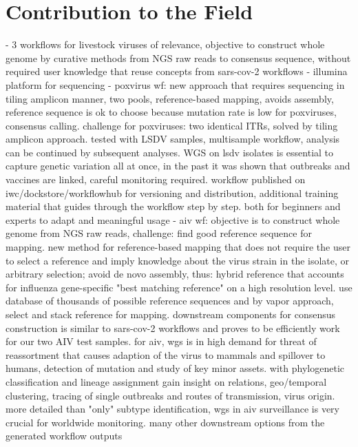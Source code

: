\section{Contribution to the Field}
\todoit
- 3 workflows for livestock viruses of relevance, objective to construct whole genome by curative methods from NGS raw reads to consensus sequence, without required user knowledge that reuse concepts from sars-cov-2 workflows 
- illumina platform for sequencing
- poxvirus wf: new approach that requires sequencing in tiling amplicon manner, two pools, reference-based mapping, avoids assembly, reference sequence is ok to choose because mutation rate is low for poxviruses, consensus calling. challenge for poxviruses: two identical ITRs, solved by tiling amplicon approach. tested with LSDV samples, multisample workflow, analysis can be continued by subsequent analyses. WGS on lsdv isolates is essential to capture genetic variation all at once, in the past it was shown that outbreaks and vaccines are linked, careful monitoring required. workflow published on iwc/dockstore/workflowhub for versioning and distribution, additional training material that guides through the workflow step by step. both for beginners and experts to adapt and meaningful usage
- aiv wf: objective is to construct whole genome from NGS raw reads, challenge: find good reference sequence for mapping. new method for reference-based mapping that does not require the user to select a reference and imply knowledge about the virus strain in the isolate, or arbitrary selection; avoid de novo assembly, thus: hybrid reference that accounts for influenza gene-specific "best matching reference" on a high resolution level. use database of thousands of possible reference sequences and by vapor approach, select and stack reference for mapping. downstream components for consensus construction is similar to sars-cov-2 workflows and proves to be efficiently work for our two AIV test samples. for aiv, wgs is in high demand for threat of reassortment that causes adaption of the virus to mammals and spillover to humans, detection of mutation and study of key minor assets. with phylogenetic classification and lineage assignment gain insight on relations, geo/temporal clustering, tracing of single outbreaks and routes of transmission, virus origin. more detailed than "only" subtype identification, wgs in aiv surveillance is very crucial for worldwide monitoring. many other downstream options from the generated workflow outputs
